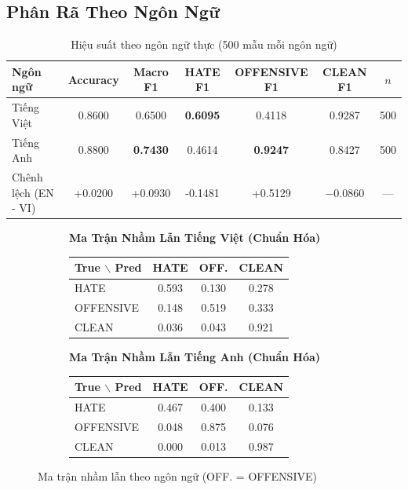 \documentclass[11pt,a4paper]{article}
\begin{document}
\subsection{Phân Rã Theo Ngôn Ngữ}

\begin{table}[H]
    \centering
    \caption{Hiệu suất theo ngôn ngữ thực (500 mẫu mỗi ngôn ngữ)}
    \label{tab:per_lang}
    \small
    \begin{tabular}{lcccccc}
        \toprule
        Ngôn ngữ             & Accuracy & Macro F1        & HATE F1         & OFFENSIVE F1    & CLEAN F1 & $n$ \\
        \midrule
        Tiếng Việt           & 0.8600   & 0.6500          & \textbf{0.6095} & 0.4118          & 0.9287   & 500 \\
        Tiếng Anh            & 0.8800   & \textbf{0.7430} & 0.4614          & \textbf{0.9247} & 0.8427   & 500 \\
        \midrule
        Chênh lệch (EN - VI) & +0.0200  & +0.0930         & -0.1481       & +0.5129         & $-$0.0860 & --- \\
        \bottomrule
    \end{tabular}
\end{table}

\begin{figure}[H]
    \centering
    \begin{subfigure}[t]{0.48\textwidth}
        \centering
        \textbf{Ma Trận Nhầm Lẫn Tiếng Việt (Chuẩn Hóa)}\\[4pt]
        \small
        \begin{tabular}{lccc}
            \toprule
            True $\backslash$ Pred & HATE  & OFF.  & CLEAN \\
            \midrule
            HATE                   & 0.593 & 0.130 & 0.278 \\
            OFFENSIVE              & 0.148 & 0.519 & 0.333 \\
            CLEAN                  & 0.036 & 0.043 & 0.921 \\
            \bottomrule
        \end{tabular}
    \end{subfigure}\hfill
    \begin{subfigure}[t]{0.48\textwidth}
        \centering
        \textbf{Ma Trận Nhầm Lẫn Tiếng Anh (Chuẩn Hóa)}\\[4pt]
        \small
        \begin{tabular}{lccc}
            \toprule
            True $\backslash$ Pred & HATE  & OFF.  & CLEAN \\
            \midrule
            HATE                   & 0.467 & 0.400 & 0.133 \\
            OFFENSIVE              & 0.048 & 0.875 & 0.076 \\
            CLEAN                  & 0.000 & 0.013 & 0.987 \\
            \bottomrule
        \end{tabular}
    \end{subfigure}
    \caption{Ma trận nhầm lẫn theo ngôn ngữ (OFF. = OFFENSIVE)}
    \label{fig:cm_lang}
\end{figure}
\end{document}
